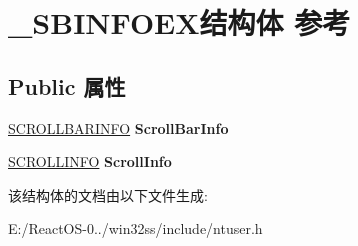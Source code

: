 \hypertarget{struct___s_b_i_n_f_o_e_x}{}\section{\+\_\+\+S\+B\+I\+N\+F\+O\+E\+X结构体 参考}
\label{struct___s_b_i_n_f_o_e_x}
\subsection*{Public 属性}
\begin{DoxyCompactItemize}
\item 
\mbox{\label{struct___s_b_i_n_f_o_e_x_a1d6330871c758dc755754bb6f27991cc}} 
\hyperlink{structtag_s_c_r_o_l_l_b_a_r_i_n_f_o}{S\+C\+R\+O\+L\+L\+B\+A\+R\+I\+N\+FO} {\bfseries Scroll\+Bar\+Info}
\item 
\mbox{\label{struct___s_b_i_n_f_o_e_x_a6e6ffb80d4c7db14c6a87ed9587fcf2b}} 
\hyperlink{structtag_s_c_r_o_l_l_i_n_f_o}{S\+C\+R\+O\+L\+L\+I\+N\+FO} {\bfseries Scroll\+Info}
\end{DoxyCompactItemize}


该结构体的文档由以下文件生成\+:\begin{DoxyCompactItemize}
\item 
E\+:/\+React\+O\+S-\/0../win32ss/include/ntuser.\+h\end{DoxyCompactItemize}

